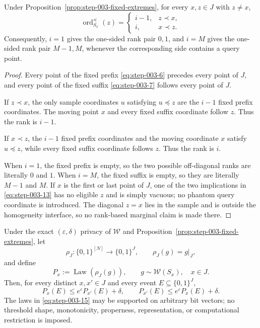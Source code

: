 \begin{lemma}
\label{lem:step-003-ranks}

Under Proposition~\ref{prop:step-003-fixed-extremes}, for every \(x,z \in J\) with \(z \ne  x\),
\[
\operatorname{ord}^{\preceq}_{S_x}(z)
=
\begin{cases}
i-1,&z\prec x,\\
i,&x\prec z.
\end{cases}
\tag{13}\label{eq:step-003-13}
\]
Consequently, \(i=1\) gives the one-sided rank pair \(0,1\), and \(i=M\) gives the one-sided rank pair \(M-1,M\), whenever the corresponding side contains a query point.

\end{lemma}

\begin{proof}

Every point of the fixed prefix \eqref{eq:step-003-6} precedes every point of \(J\), and every point of the fixed suffix \eqref{eq:step-003-7} follows every point of \(J\).

If \(z \prec x\), the only sample coordinates \(u\) satisfying \(u \preceq z\) are the \(i-1\) fixed prefix coordinates. The moving point \(x\) and every fixed suffix coordinate follow \(z\). Thus the rank is \(i-1\).

If \(x \prec z\), the \(i-1\) fixed prefix coordinates and the moving coordinate \(x\) satisfy \(u \preceq z\), while every fixed suffix coordinate follows \(z\). Thus the rank is \(i\).

When \(i=1\), the fixed prefix is empty, so the two possible off-diagonal ranks are literally \(0\) and \(1\). When \(i=M\), the fixed suffix is empty, so they are literally \(M-1\) and \(M\). If \(x\) is the first or last point of \(J\), one of the two implications in \eqref{eq:step-003-13} has no eligible \(z\) and is simply vacuous; no phantom query coordinate is introduced. The diagonal \(z=x\) lies in the sample and is outside the homogeneity interface, so no rank-based marginal claim is made there.

\end{proof}


\begin{proposition}
\label{prop:step-003-private-restrictions}

Under the exact \((\varepsilon,\delta)\) privacy of \(\mathcal W\) and Proposition~\ref{prop:step-003-fixed-extremes}, let
\[
\rho_J:\{0,1\}^{[N]}\longrightarrow\{0,1\}^J,
\qquad
\rho_J(g)=g|_J,
\tag{14}\label{eq:step-003-14}
\]
and define
\[
P_x:=\operatorname{Law}(\rho_J(g)),
\qquad g\sim\mathcal W(S_x),
\quad x\in J.
\tag{15}\label{eq:step-003-15}
\]
Then, for every distinct \(x,x' \in J\) and every event \(E \subseteq \{0,1\}^J\),
\[
P_x(E)\le e^\varepsilon P_{x'}(E)+\delta,
\qquad
P_{x'}(E)\le e^\varepsilon P_x(E)+\delta.
\tag{16}\label{eq:step-003-16}
\]
The laws in \eqref{eq:step-003-15} may be supported on arbitrary bit vectors; no threshold shape, monotonicity, properness, representation, or computational restriction is imposed.

\end{proposition}

